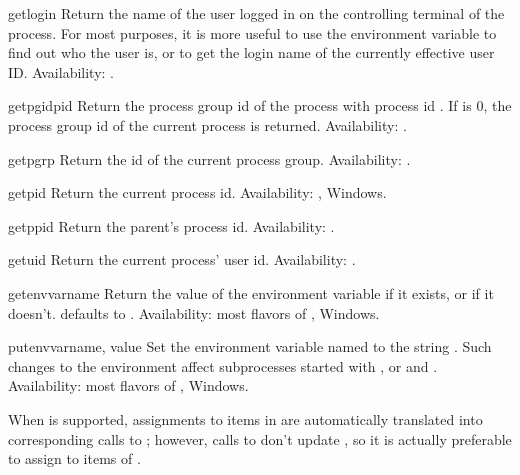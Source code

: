 \begin{funcdesc}{getlogin}{}
Return the name of the user logged in on the controlling terminal of
the process.  For most purposes, it is more useful to use the
environment variable  to find out who the user is,
or  to get the login name
of the currently effective user ID.
Availability: \UNIX.
\end{funcdesc}

\begin{funcdesc}{getpgid}{pid}
Return the process group id of the process with process id .
If  is 0, the process group id of the current process is
returned. Availability: \UNIX.
\end{funcdesc}

\begin{funcdesc}{getpgrp}{}
Return the id of the current process group.
Availability: \UNIX.
\end{funcdesc}

\begin{funcdesc}{getpid}{}
Return the current process id.
Availability: \UNIX, Windows.
\end{funcdesc}

\begin{funcdesc}{getppid}{}
Return the parent's process id.
Availability: \UNIX.
\end{funcdesc}

\begin{funcdesc}{getuid}{}
Return the current process' user id.
Availability: \UNIX.
\end{funcdesc}

\begin{funcdesc}{getenv}{varname}
Return the value of the environment variable  if it
exists, or  if it doesn't.   defaults to
.
Availability: most flavors of \UNIX, Windows.
\end{funcdesc}

\begin{funcdesc}{putenv}{varname, value}
Set the environment variable named  to the string
.  Such changes to the environment affect subprocesses
started with ,  or
 and .
Availability: most flavors of \UNIX, Windows.


When  is
supported, assignments to items in  are automatically
translated into corresponding calls to ; however,
calls to  don't update , so it is
actually preferable to assign to items of .
\end{funcdesc}

